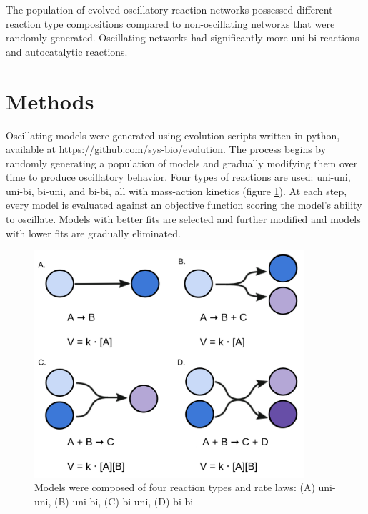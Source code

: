 \documentclass[12pt]{report}
\begin{document}
The population of evolved oscillatory reaction networks possessed different reaction type compositions compared to non-oscillating networks that were randomly generated. Oscillating networks had significantly more uni-bi reactions and autocatalytic reactions. 


\section{Methods}
Oscillating models were generated using evolution scripts written in python, available at https://github.com/sys-bio/evolution. The process begins by randomly generating a population of models and gradually modifying them over time to produce oscillatory behavior. Four types of reactions are used: uni-uni, uni-bi, bi-uni, and bi-bi, all with mass-action kinetics (figure \ref{fig:reaction}). At each step, every model is evaluated against an objective function scoring the model's ability to oscillate. Models with better fits are selected and further modified and models with lower fits are gradually eliminated. 
\begin{figure}
    \centering
    \includegraphics[width=10cm]{images/Reactions.png}
    \caption[Types of reactions and their rate laws]{Models were composed of four reaction types and rate laws: (A) uni-uni, (B) uni-bi, (C) bi-uni, (D) bi-bi}
    \label{fig:reaction}
    
\end{figure}
\end{document}
